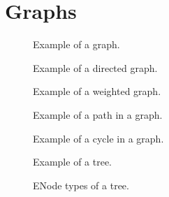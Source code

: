 \section{Graphs}

\begin{figure}[tbp]
  
  \caption{Example of a graph.}
  \label{fig:bs:graphs:graph}
\end{figure}

\begin{figure}[tbp]
  
  \caption{Example of a directed graph.}
  \label{fig:bs:graphs:directed}
\end{figure}

\begin{figure}[tbp]
  
  \caption{Example of a weighted graph.}
  \label{fig:bs:graphs:weighted}
\end{figure}

\begin{figure}[tbp]
  
  \caption{Example of a path in a graph.}
  \label{fig:bs:graphs:path}
\end{figure}

\begin{figure}[tbp]
  
  \caption{Example of a cycle in a graph.}
  \label{fig:bs:graphs:cycle}
\end{figure}

\begin{figure}[tbp]
  
  \caption{Example of a tree.}
  \label{fig:bs:graphs:trees}
\end{figure}

\begin{figure}[tbp]
  
  \caption{ENode types of a tree.}
  \label{fig:bs:graphs:trees:nodetypes}
\end{figure}

